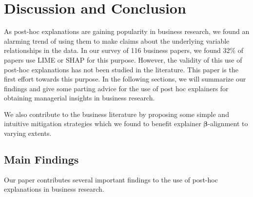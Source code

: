 \documentclass[mnsc,blindrev]{informs3}
\begin{document}
\section{Discussion and Conclusion}
    \label{sec:discussion}
    As post-hoc explanations are gaining popularity in business research, we found an alarming trend of using them to make claims about the underlying variable relationships in the data. In our survey of 116 business papers, we found 32\% of papers use LIME or SHAP for this purpose. However, the validity of this use of post-hoc explanations has not been studied in the literature. 
    This paper is the first effort towards this purpose. 
     In the following sections, we will summarize our findings and give some parting advice for the use of post hoc explainers for obtaining managerial insights in business research. 

    We also contribute to the business literature by proposing some simple and intuitive mitigation strategies which we found to benefit explainer $\boldsymbol{\beta}$-alignment to varying extents.

    \subsection{Main Findings}
        Our paper contributes several important findings to the use of post-hoc explanations in business research.
\end{document}
